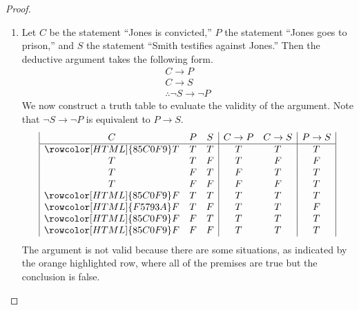 \documentclass[12pt]{amsart}
\theoremstyle{definition}
\theoremstyle{remark}
\begin{document}
\begin{proof}
\hfill
\begin{enumerate}
	\item Let $C$ be the statement ``Jones is convicted,'' $P$ the statement ``Jones goes to prison,'' and $S$ the statement ``Smith testifies against Jones.''
	Then the deductive argument takes the following form.
	\begin{equation*}
		\begin{array}{l}
			C \rightarrow P \\
			C \rightarrow S \\
			\hline
			\therefore \neg S \rightarrow \neg P
		\end{array}
	\end{equation*}
	We now construct a truth table to evaluate the validity of the argument.
	Note that $\neg S \rightarrow \neg P$ is equivalent to $P \rightarrow S$.
	\begin{equation*}
		\begin{array}{| c c c | c c | c |}
			C & P & S & C \rightarrow P & C \rightarrow S & P \rightarrow S \\
			\hline
			\rowcolor[HTML]{85C0F9} T & T & T & T & T & T \\
			T & T & F & T & F & F \\
			T & F & T & F & T & T \\
			T & F & F & F & F & T \\
			\rowcolor[HTML]{85C0F9} F & T & T & T & T & T \\
			\rowcolor[HTML]{F5793A} F & T & F & T & T & F \\
			\rowcolor[HTML]{85C0F9} F & F & T & T & T & T \\
			\rowcolor[HTML]{85C0F9} F & F & F & T & T & T
		\end{array}
	\end{equation*}
	The argument is not valid because there are some situations, as indicated by the orange highlighted row, where all of the premises are true but the conclusion is false.
	

\end{enumerate}
\end{proof}
\end{document}
